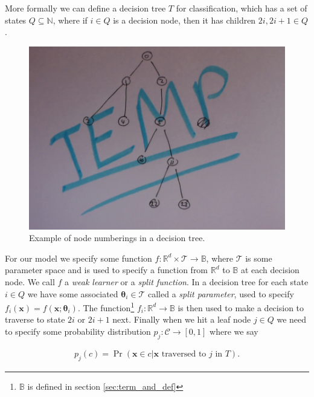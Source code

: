 \documentclass[12pt,twoside,notitlepage]{report}
\newcommand{\vc}[1]{\mathbf{#1}}
\newcommand{\cl}[1]{\mathcal{#1}}
\newcommand{\bb}[1]{\mathbb{#1}}
\begin{document}
            More formally we can define a decision tree $T$ for classification, which has a set of states $Q \subseteq 
            \bb{N}$, where if $i \in Q$ is a decision node, then it has children $2i, 2i+1 \in Q$. 

            \begin{figure}[H]
                \centering
                \includegraphics[scale=0.5]{tree_node_labels.jpeg}
                \caption{Example of node numberings in a decision tree.}
            \end{figure}

            For our model we specify some function $f:\bb{R}^d \times \cl{T} \rightarrow \bb{B}$, where $\cl{T}$ is some 
            parameter space and is used to specify a function from $\bb{R}^d$ to $\bb{B}$ at each decision node. We call 
            $f$ a \textit{weak learner} or a \textit{split function}. In a decision tree for each state $i \in Q$ we have 
            some associated $\vc{\theta}_i \in \cl{T}$ called a \textit{split parameter}, used to specify 
            $f_i(\vc{x}) = f(\vc{x}; \vc{\theta}_i)$. The function\footnote{$\bb{B}$ is defined in section 
            \ref{sec:term_and_def}} $f_i : \bb{R}^d \rightarrow \bb{B}$ is then used to make a decision to traverse to 
            state $2i$ or $2i+1$ next. Finally when we hit a leaf node $j \in Q$ we need to specify some probability 
            distribution $p_j:\cl{C} \rightarrow [0,1]$ where we say 

            \begin{align}
                p_j(c) = \Pr(\vc{x} \in c | \vc{x} \text{ traversed to } j \text{ in } T).
            \end{align}
\end{document}

